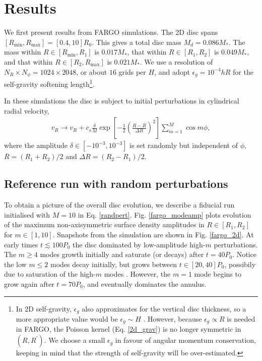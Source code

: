 \section{Results}
We first present results from FARGO simulations. The 2D disc spans
$[R_\mathrm{min}, R_\mathrm{max}] = [0.4,10]R_0$. This gives a total
disc mass $M_{d}=0.086M_*$. The mass within
$R\in[R_\mathrm{min},R_{1}]$ is $0.017M_*$, that within
$R\in[R_{1},R_{2}]$ is $0.049M_*$, and that within
$R\in[R_{2},R_\mathrm{max}]$ is $0.021M_*$. We use a resolution of
$N_R\times N_\phi = 1024\times 2048$, or about $16$ grids per $H$, and
adopt $\epsilon_g=10^{-4}hR$ for the   
self-gravity softening length\footnote{In 2D self-gravity, $\epsilon_g$ also
  approximates for the vertical disc thickness, so a more appropriate
  value would be $\epsilon_g\sim H$ \citep{muller12}. However, because
  $\epsilon_g\propto R$ is needed in FARGO, the Poisson kernel
  (Eq. \ref{2d_grav}) is no longer symmetric in $(R,R^\prime)$. We
  choose a small  
  $\epsilon_g$ in favour of angular momentum conservation, keeping in
  mind that the strength of self-gravity will be over-estimated.}.

In these simulations the disc is subject to initial perturbations in 
cylindrical radial velocity, 
\begin{align}\label{randpert}
  v_R \to v_R+ c_s\frac{\delta}{M}
  \exp{\left[-\frac{1}{2}\left(\frac{R-\overline{R}}{\Delta 
          R}\right)^2\right]}\sum_{m=1}^M\cos{m\phi},
\end{align}
where the amplitude $\delta\in[-10^{-3},10^{-3}]$ is set randomly but
independent of $\phi$, $\overline{R} = (R_{1}+R_{2})/2$
and $\Delta R = (R_{2}-R_{1})/2$. 

\subsection{Reference run with random perturbations}
To obtain a picture of the overall disc evolution, we describe a 
fiducial run initialised with $M=10$ in Eq. \ref{randpert}. 
Fig. \ref{fargo_modeamp} plots evolution of the maximum 
non-axisymmetric surface density amplitudes in $R\in[R_{1},R_{2}]$
for $m\in[1,10]$. Snapshots from the simulation are shown in
Fig. \ref{fargo_2d}. 
At early times $t\lesssim100P_0$ the disc 
dominated by low-amplitude high-$m$ perturbations. The $m\geq4$ modes
growth initially and saturate (or decays) after $t=40P_0$. Notice the
low $m\leq 2$ modes decay initially, but grows between $t\in[20,40]P_0$,
possibily due to saturation of the high-$m$ modes  
\citep{laughlin96,laughlin97}. However, the $m=1$ mode begins to grow
again after $t=70P_0$, and eventually dominates the annulus. 

